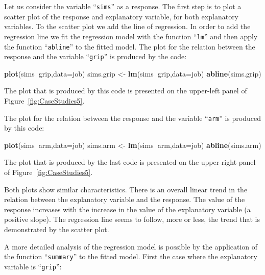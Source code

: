\documentclass[
]{krantz}
\makeatletter
\newenvironment{Shaded}{\begin{snugshade}}{\end{snugshade}}
\newcommand{\DataTypeTok}[1]{\textcolor[rgb]{0.13,0.29,0.53}{#1}}
\newcommand{\KeywordTok}[1]{\textcolor[rgb]{0.13,0.29,0.53}{\textbf{#1}}}
\newcommand{\NormalTok}[1]{#1}
\newcommand{\OperatorTok}[1]{\textcolor[rgb]{0.81,0.36,0.00}{\textbf{#1}}}
\newcommand{\StringTok}[1]{\textcolor[rgb]{0.31,0.60,0.02}{#1}}
\newenvironment{kframe}{%
\medskip{}
\setlength{\fboxsep}{.8em}
 \def\at@end@of@kframe{}%
 \ifinner\ifhmode%
  \def\at@end@of@kframe{\end{minipage}}%
  \begin{minipage}{\columnwidth}%
 \fi\fi%
 \def\FrameCommand##1{\hskip\@totalleftmargin \hskip-\fboxsep
 \colorbox{shadecolor}{##1}\hskip-\fboxsep
     \hskip-\linewidth \hskip-\@totalleftmargin \hskip\columnwidth}%
 \MakeFramed {\advance\hsize-\width
   \@totalleftmargin\z@ \linewidth\hsize
   \@setminipage}}%
 {\par\unskip\endMakeFramed%
 \at@end@of@kframe}
\renewenvironment{Shaded}{\begin{kframe}}{\end{kframe}}
\theoremstyle{definition}
\theoremstyle{definition}
\theoremstyle{definition}
\theoremstyle{remark}
\makeatother
\begin{document}
Let us consider the variable ``\texttt{sims}'' as a response. The first step is
to plot a scatter plot of the response and explanatory variable, for
both explanatory variables. To the scatter plot we add the line of
regression. In order to add the regression line we fit the regression
model with the function ``\texttt{lm}'' and then apply the function ``\texttt{abline}'' to
the fitted model. The plot for the relation between the response and the
variable ``\texttt{grip}'' is produced by the code:

\begin{Shaded}
\begin{Highlighting}[]
\KeywordTok{plot}\NormalTok{(sims}\OperatorTok{~}\NormalTok{grip,}\DataTypeTok{data=}\NormalTok{job)}
\NormalTok{sims.grip <-}\StringTok{ }\KeywordTok{lm}\NormalTok{(sims}\OperatorTok{~}\NormalTok{grip,}\DataTypeTok{data=}\NormalTok{job)}
\KeywordTok{abline}\NormalTok{(sims.grip)}
\end{Highlighting}
\end{Shaded}

The plot that is produced by this code is presented on the upper-left
panel of Figure~\ref{fig:CaseStudies5}.

The plot for the relation between the response and the variable ``\texttt{arm}''
is produced by this code:

\begin{Shaded}
\begin{Highlighting}[]
\KeywordTok{plot}\NormalTok{(sims}\OperatorTok{~}\NormalTok{arm,}\DataTypeTok{data=}\NormalTok{job)}
\NormalTok{sims.arm <-}\StringTok{ }\KeywordTok{lm}\NormalTok{(sims}\OperatorTok{~}\NormalTok{arm,}\DataTypeTok{data=}\NormalTok{job)}
\KeywordTok{abline}\NormalTok{(sims.arm)}
\end{Highlighting}
\end{Shaded}

The plot that is produced by the last code is presented on the
upper-right panel of Figure~\ref{fig:CaseStudies5}.

Both plots show similar characteristics. There is an overall linear
trend in the relation between the explanatory variable and the response.
The value of the response increases with the increase in the value of
the explanatory variable (a positive slope). The regression line seems
to follow, more or less, the trend that is demonstrated by the scatter
plot.

A more detailed analysis of the regression model is possible by the
application of the function ``\texttt{summary}'' to the fitted model. First the
case where the explanatory variable is ``\texttt{grip}'':
\end{document}
